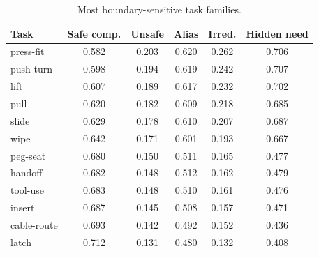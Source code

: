 \begin{table}[t]
\centering
\caption{Most boundary-sensitive task families.}
\label{tab:task-summary}
\small
\begin{tabular}{lccccc}
\toprule
Task & Safe comp. & Unsafe & Alias & Irred. & Hidden need \\
\midrule
press-fit & 0.582 & 0.203 & 0.620 & 0.262 & 0.706 \\
push-turn & 0.598 & 0.194 & 0.619 & 0.242 & 0.707 \\
lift & 0.607 & 0.189 & 0.617 & 0.232 & 0.702 \\
pull & 0.620 & 0.182 & 0.609 & 0.218 & 0.685 \\
slide & 0.629 & 0.178 & 0.610 & 0.207 & 0.687 \\
wipe & 0.642 & 0.171 & 0.601 & 0.193 & 0.667 \\
peg-seat & 0.680 & 0.150 & 0.511 & 0.165 & 0.477 \\
handoff & 0.682 & 0.148 & 0.512 & 0.162 & 0.479 \\
tool-use & 0.683 & 0.148 & 0.510 & 0.161 & 0.476 \\
insert & 0.687 & 0.145 & 0.508 & 0.157 & 0.471 \\
cable-route & 0.693 & 0.142 & 0.492 & 0.152 & 0.436 \\
latch & 0.712 & 0.131 & 0.480 & 0.132 & 0.408 \\
\bottomrule
\end{tabular}
\end{table}
